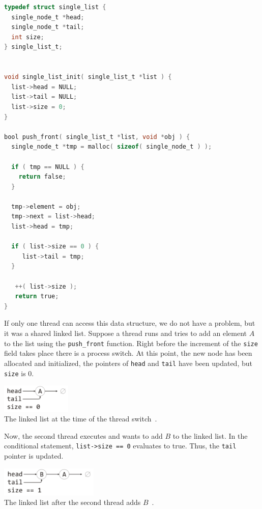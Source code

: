 \documentclass[a4paper]{report}
\begin{document}
\begin{appendices}
\begin{lstlisting}[language=C]
typedef struct single_list {
  single_node_t *head;
  single_node_t *tail;
  int size;
} single_list_t;


void single_list_init( single_list_t *list ) {
  list->head = NULL;
  list->tail = NULL;
  list->size = 0;
}

bool push_front( single_list_t *list, void *obj ) {
  single_node_t *tmp = malloc( sizeof( single_node_t ) );
  
  if ( tmp == NULL ) {
    return false;
  }
  
  tmp->element = obj;
  tmp->next = list->head;
  list->head = tmp;

  if ( list->size == 0 ) {
     list->tail = tmp;
  }
  
   ++( list->size );
   return true;
}
\end{lstlisting}

If only one thread can access this data structure, we do not have a problem, but it was a shared linked list. Suppose a thread runs and tries to add an element $A$ to the list using the \texttt{push\_front} function. Right before the increment of the \texttt{size} field takes place there is a process switch. At this point, the new node has been allocated and initialized, the pointers of \texttt{head} and \texttt{tail} have been updated, but \texttt{size} is 0. 

\begin{center}
\includegraphics[width=0.25\textwidth]{images/linkedlist1.png}\\
The linked list at the time of the thread switch~\cite{mte241}.
\end{center}

Now, the second thread executes and wants to add $B$ to the linked list. In the conditional statement, \texttt{list->size == 0} evaluates to true. Thus, the \texttt{tail} pointer is updated.

\begin{center}
\includegraphics[width=0.35\textwidth]{images/linkedlist2.png}\\
The linked list after the second thread adds $B$~\cite{mte241}.
\end{center}


\end{appendices}
\end{document}
